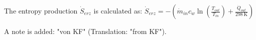 The entropy production \( \dot{S}_{erz} \) is calculated as:  
\( \dot{S}_{erz} = -\left( \dot{m}_{in} c_{w} \ln \left( \frac{T_{out}}{T_{in}} \right) + \frac{\dot{Q}_{out}}{298 \, \text{K}} \right) \)  

A note is added:  
"von KF" (Translation: "from KF").